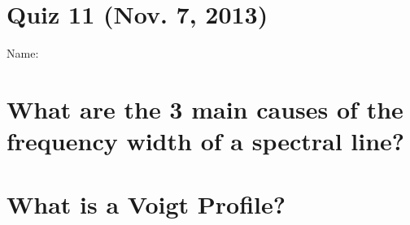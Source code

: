 \documentclass[11pt]{article}
\begin{document}
\pagestyle{empty}
\parindent=0pt

\section*{\centering Quiz 11 (Nov.  7, 2013)}

{\large
Name:\\
}

\section{What are the 3 main causes of the frequency width of a spectral line?}
\vspace{1.3in}
\section{What is a Voigt Profile?}
~
\vspace{1.3in}
\end{document}
